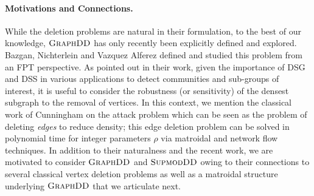 \documentclass{article}
\newcommand{\dds}{\ensuremath{\textsc{GraphDD}}\xspace}
\newcommand{\sdds}{\ensuremath{\textsc{SupmodDD}}\xspace}
\begin{document}
\paragraph{Motivations and Connections.}
While the deletion problems are natural in their formulation, to the best of our knowledge, \dds has only recently been explicitly defined and explored. Bazgan, Nichterlein and Vazquez Alferez \cite{bazgan_et_alSWAT2024} defined and studied this problem from an FPT perspective.  As pointed out in their work, given the importance of DSG and DSS in various applications to detect communities and sub-groups of interest, it is useful to consider the robustness (or sensitivity) of the densest subgraph to the removal of vertices. In this context, we mention the classical work of Cunningham on the attack problem \cite{Cunningham85} which
can be seen as the problem of deleting \emph{edges} to reduce density;
this edge deletion problem can be solved in polynomial time for integer parameters $\rho$ via matroidal and network flow techniques. In addition to their naturalness and the recent work, we are motivated to consider \dds and \sdds owing to their connections to several classical vertex deletion problems as well as a matroidal structure underlying \dds that we articulate next.
\end{document}
